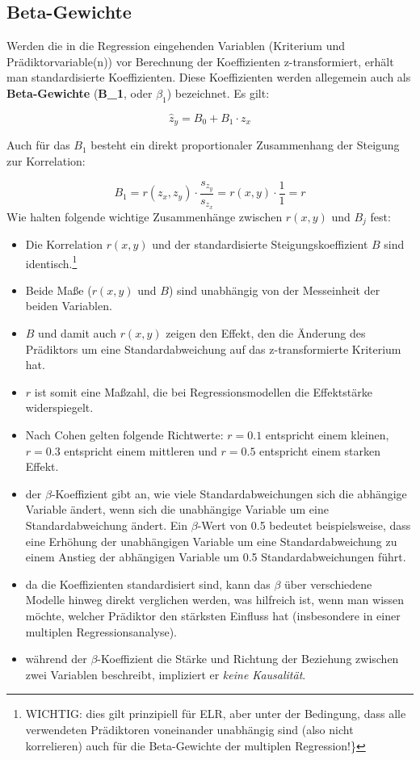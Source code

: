 \documentclass[
]{article}
\providecommand{\tightlist}{%
  \setlength{\itemsep}{0pt}\setlength{\parskip}{0pt}}
\begin{document}
\subsection*{Beta-Gewichte}\label{beta-gewichte}

Werden die in die Regression eingehenden Variablen (Kriterium und Prädiktorvariable(n)) vor Berechnung der Koeffizienten z-transformiert, erhält man standardisierte Koeffizienten. Diese Koeffizienten werden allegemein auch als \textbf{Beta-Gewichte} (\textbf{B\_1}, oder \(\beta_1\)) bezeichnet. Es gilt:

\[\hat{z}_y = B_0 + B_1 \cdot z_x\]

Auch für das \(B_1\) besteht ein direkt proportionaler Zusammenhang der Steigung zur Korrelation:

\[B_1 = r(z_x, z_y) \cdot \frac{s_{z_y}}{s_{z_x}} = r(x, y) \cdot \frac{1}{1} = r\]
Wie halten folgende wichtige Zusammenhänge zwischen \(r(x,y)\) und \(B_j\) fest:

\begin{itemize}
\tightlist
\item
  Die Korrelation \(r(x,y)\) und der standardisierte Steigungskoeffizient \(B\) sind identisch.\footnote{WICHTIG: dies gilt prinzipiell für ELR, aber unter der Bedingung, dass alle verwendeten Prädiktoren voneinander unabhängig sind (also nicht korrelieren) auch für die Beta-Gewichte der multiplen Regression!\}}
\item
  Beide Maße (\(r(x,y)\) und \(B\)) sind unabhängig von der Messeinheit der beiden Variablen.
\item
  \(B\) und damit auch \(r(x,y)\) zeigen den Effekt, den die Änderung des Prädiktors um eine Standardabweichung auf das z-transformierte Kriterium hat.
\item
  \(r\) ist somit eine Maßzahl, die bei Regressionsmodellen die Effektstärke widerspiegelt.
\item
  Nach Cohen gelten folgende Richtwerte: \(r = 0.1\) entspricht einem kleinen, \(r = 0.3\) entspricht einem mittleren und \(r = 0.5\) entspricht einem starken Effekt.
\item
  der \(\beta\)-Koeffizient gibt an, wie viele Standardabweichungen sich die abhängige Variable ändert, wenn sich die unabhängige Variable um eine Standardabweichung ändert. Ein \(\beta\)-Wert von 0.5 bedeutet beispielsweise, dass eine Erhöhung der unabhängigen Variable um eine Standardabweichung zu einem Anstieg der abhängigen Variable um 0.5 Standardabweichungen führt.
\item
  da die Koeffizienten standardisiert sind, kann das \(\beta\) über verschiedene Modelle hinweg direkt verglichen werden, was hilfreich ist, wenn man wissen möchte, welcher Prädiktor den stärksten Einfluss hat (insbesondere in einer multiplen Regressionsanalyse).
\item
  während der \(\beta\)-Koeffizient die Stärke und Richtung der Beziehung zwischen zwei Variablen beschreibt, impliziert er \emph{keine Kausalität}.
\end{itemize}
\end{document}
